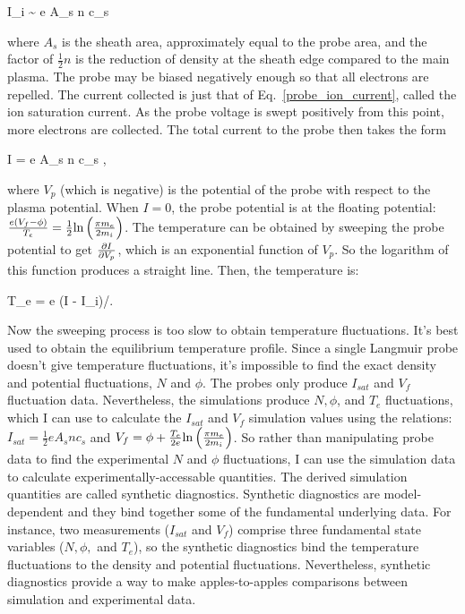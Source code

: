 \beq
\label{probe_ion_current}
I_i \sim {} e A_s n c_s
\eeq

where $A_s$ is the sheath area, approximately equal to the probe area, and the factor of $\frac{1}{2} n$ is the reduction of density at the sheath edge compared to the main plasma.
The probe may be biased negatively enough so that all electrons are repelled. The current collected is just that of Eq.~\ref{probe_ion_current}, called the ion saturation current.
As the probe voltage is swept positively from this point, more electrons are collected. The total current to the probe then takes the form~\cite{hutchinson2002}

\beq
\label{probe_current}
I = e A_s n c_s ,
\eeq

where $V_p$ (which is negative) is the potential of the probe with respect to the plasma potential. When $I=0$, the probe potential is at the floating potential: 
$\frac{e (V_f - \phi)}{T_e} = \frac{1}{2} {\rm ln} \left(\frac{\pi m_e}{2 m_i}\right)$. The temperature can be obtained by sweeping the probe potential to get $\frac{\partial I}{\partial V_p}$, 
which is an exponential function of $V_p$.
So the logarithm of this function produces a straight line. Then, the temperature is:

\beq
\label{probe_temp}
T_e = e (I - I_i)/.
\eeq

Now the sweeping process is too slow to obtain temperature fluctuations. It's best used to obtain the equilibrium temperature profile. Since a single Langmuir probe doesn't give
temperature fluctuations, it's impossible to find the exact density and potential fluctuations, $N$ and $\phi$. The probes only produce $I_{sat}$ and $V_f$ fluctuation data.
Nevertheless, the simulations produce $N, \phi$, and $T_e$
fluctuations, which I can use to calculate the $I_{sat}$ and $V_f$ simulation values using the relations: $I_{sat} = \frac{1}{2} e A_s n c_s$ and
$V_f = \phi + \frac{T_e}{2 e} {\rm ln} \left(\frac{\pi m_e}{2 m_i}\right)$. So rather than manipulating probe data to find the experimental $N$ and $\phi$ fluctuations, I can
use the simulation data to calculate experimentally-accessable quantities. The derived simulation quantities are called synthetic diagnostics. 
Synthetic diagnostics are model-dependent and they bind together some of the fundamental
underlying data. For instance, two measurements ($I_{sat}$ and $V_f$) comprise three fundamental state variables ($N, \phi,$ and $T_e$), so the synthetic diagnostics bind the temperature fluctuations
to the density and potential fluctuations. Nevertheless, synthetic diagnostics provide a way to make
apples-to-apples comparisons between simulation and experimental data.



